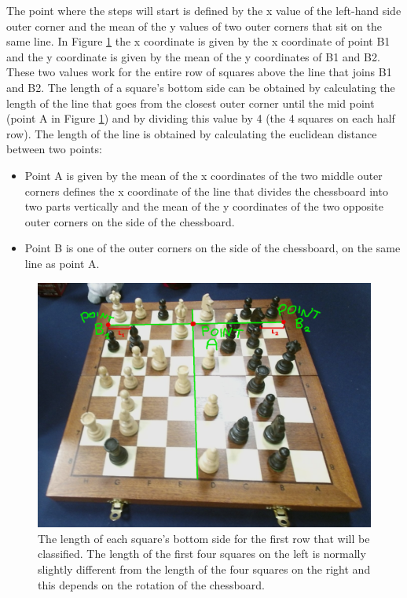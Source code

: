 \documentclass{l4proj}
\begin{document}
The point where the steps will start is defined by the x value of the left-hand side outer corner and the mean of the y values of two outer corners that sit on the same line. In Figure \ref{length_of_line} the x coordinate is given by the x coordinate of point B1 and the y coordinate is given by the mean of the y coordinates of B1 and B2. These two values work for the entire row of squares above the line that joins B1 and B2. The length of a square's bottom side can be obtained by calculating the length of the line that goes from the closest outer corner until the mid point (point A in Figure \ref{length_of_line}) and by dividing this value by 4 (the 4 squares on each half row). The length of the line is obtained by calculating the euclidean distance between two points: 

\begin{itemize}
	
	\item Point A is given by the mean of the x coordinates of the two middle outer corners defines the x coordinate of the line that divides the chessboard into two parts vertically and the mean of the y coordinates of the two opposite outer corners on the side of the chessboard.
	
	\item Point B is one of the outer corners on the side of the chessboard, on the same line as point A.
	
\end{itemize}


\begin{figure}[h!]
\centering
\includegraphics[scale=0.29]{length_of_line3.png}
\caption{The length of each square's bottom side for the first row that will be classified. The length of the first four squares on the left is normally slightly different from the length of the four squares on the right and this depends on the rotation of the chessboard.}
\label{length_of_line}
\end{figure}
\end{document}
